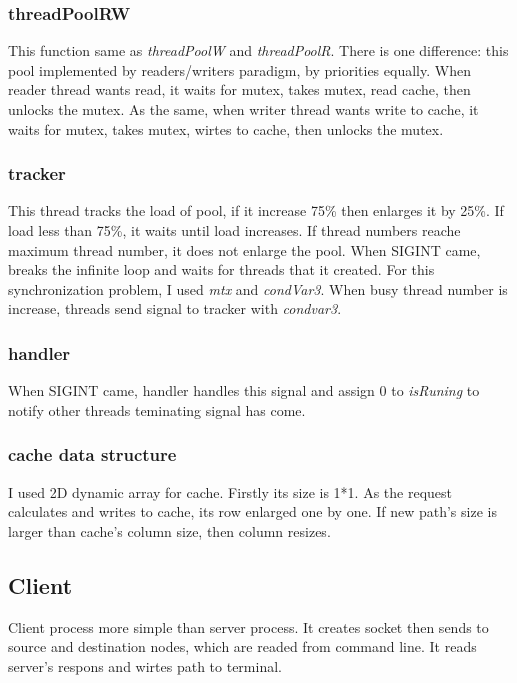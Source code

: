 \documentclass[twoside,11pt]{article}
\begin{document}
\subsubsection{threadPoolRW}

This function same as \emph{threadPoolW} and \emph{threadPoolR}. There is one difference: this pool implemented by readers/writers paradigm, by priorities equally. When reader thread wants read, it waits for mutex, takes mutex, read cache, then unlocks the mutex. As the same,  when writer thread wants write to cache, it waits for mutex, takes mutex, wirtes to cache, then unlocks the mutex.\newline

\subsubsection{tracker}

This thread tracks the load of pool, if it increase 75\% then enlarges it by 25\%. If load less than 75\%, it waits until load increases. If thread numbers reache maximum thread number, it does not enlarge the pool. When SIGINT came, breaks the infinite loop and waits for threads that it created.
\newline
For this synchronization problem, I used \emph{mtx} and \emph{condVar3}. When busy thread number is increase, threads send signal to tracker with \emph{condvar3}.

\subsubsection{handler}

When SIGINT came, handler handles this signal and assign 0 to \emph{isRuning} to notify other threads teminating signal has come.

\subsubsection{cache data structure}

I used 2D dynamic array for cache. Firstly its size is 1*1. As the request calculates and writes to cache, its row enlarged one by one. If new path's size is larger than cache's column size, then column resizes.

\subsection{Client}

Client process more simple than server process. It creates socket then sends to source and destination nodes, which are readed from command line. It reads server's respons and wirtes path to terminal. \newpage
\end{document}
